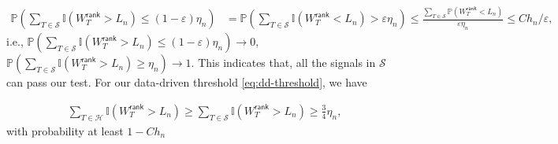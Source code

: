 \documentclass[12pt]{article}
\newcommand{\tF}{{\rm F}}
\newcommand{\abs}[1]{\left\lvert#1\right\rvert}
\newcommand{\norm}[1]{\left\lVert#1\right\rVert}
\newcommand{\PP}{\mathbb{P}}
\newcommand{\cH}{\mathcal{H}}
\newcommand{\cP}{\mathcal{P}}
\newcommand{\cS}{\mathcal{S}}
\newcommand{\bbI}{\mathbb{I}}
\def\PP{{\mathbb P}}
\theoremstyle{plain}
\begin{document}
 \begin{equation*}
\begin{aligned}
               \PP(\sum\limits_{T\in\cS} \bbI(W_T^\mathsf{rank}> L_n)\le (1-\varepsilon)\eta_n )& =\PP(\sum\limits_{T\in\cS} \bbI(W_T^\mathsf{rank}< L_n)> \varepsilon\eta_n )  \le \frac{\sum\limits_{T\in\cS} \PP(W_T^\mathsf{rank}< L_n)}{\varepsilon\eta_n}\le C h_n/\varepsilon,
\end{aligned}
 \end{equation*}
 i.e., $ \PP(\sum\limits_{T\in\cS} \bbI(W_T^\mathsf{rank}> L_n)\le (1-\varepsilon)\eta_n )\to 0$, $ \PP(\sum\limits_{T\in\cS} \bbI(W_T^\mathsf{rank}> L_n)\ge \eta_n )\to 1$. This indicates that, all the signals in $\cS$ can pass our test. For our data-driven threshold \eqref{eq:dd-threshold}, we have 
 
  \begin{equation}\label{eq:dd-thre-lb}
\begin{aligned}
             \sum\limits_{T\in\cH} \bbI(W_T^\mathsf{rank}> L_n)\ge   \sum\limits_{T\in\cS} \bbI(W_T^\mathsf{rank}> L_n)\ge \frac{3}{4}\eta_n,
\end{aligned}
 \end{equation}
 with probability at least $1-C h_n$
\end{document}
